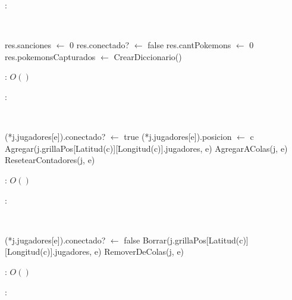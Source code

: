\begin{Algoritmos}
	\justifcomp:

	~

	\begin{algorithm}[H]
		\NoCaptionOfAlgo
		\caption{}
		res.sanciones $\leftarrow$ 0\;
		res.conectado? $\leftarrow$ false\;
		res.cantPokemons $\leftarrow$ 0\;
		res.pokemonsCapturados $\leftarrow$ CrearDiccionario()\;
	\end{algorithm}

	\complejidad: $O()$

	\justifcomp:

	~

	\begin{algorithm}[H]
		\NoCaptionOfAlgo
		\caption{}
		(*j.jugadores[e]).conectado? $\leftarrow$ true\;
		(*j.jugadores[e]).posicion $\leftarrow$ c\;
		Agregar(j.grillaPos[Latitud(c)][Longitud(c)].jugadores, e)\; %
		AgregarAColas(j, e)\; %
		ResetearContadores(j, e)\; %
	\end{algorithm}

	\complejidad: $O()$

	\justifcomp:

	~

	\begin{algorithm}[H]
		\NoCaptionOfAlgo
		\caption{}
		(*j.jugadores[e]).conectado? $\leftarrow$ false\;
		Borrar(j.grillaPos[Latitud(c)][Longitud(c)].jugadores, e)\;
		RemoverDeColas(j, e)\; %
	\end{algorithm}

	\complejidad: $O()$

	\justifcomp:

	~


\end{Algoritmos}
